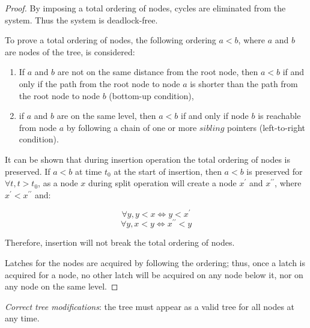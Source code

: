 \begin{proof}
  By imposing a total ordering of nodes, cycles are eliminated from the system. Thus the system is deadlock-free.

  To prove a total ordering of nodes, the following ordering $a < b$, where $a$ and $b$ are nodes of the tree, is considered:

  \begin{enumerate}
    \item If $a$ and $b$ are not on the same distance from the root node, then $a < b$ if and only if the path from the root node to node $a$ is shorter than the path from the root node to node $b$ (bottom-up condition),
    \item if $a$ and $b$ are on the same level, then $a < b$ if and only if node $b$ is reachable from node $a$ by following a chain of one or more $sibling$ pointers (left-to-right condition).
  \end{enumerate}

  It can be shown that during insertion operation the total ordering of nodes is preserved. If $a < b$ at time $t_0$ at the start of insertion, then $a < b$ is preserved for $\forall t, t > t_0$, as a node $x$ during split operation will create a node $x^\prime$ and $x^{\prime\prime}$, where $x^\prime < x^{\prime\prime}$ and:

  $$\forall y, y < x \Leftrightarrow y < x^\prime$$
  $$\forall y, x < y \Leftrightarrow x^{\prime\prime} < y$$

  Therefore, insertion will not break the total ordering of nodes.

  Latches for the nodes are acquired by following the ordering; thus, once a latch is acquired for a node, no other latch will be acquired on any node below it, nor on any node on the same level.
\end{proof}

\begin{theorem}\label{theorem:b-link-tree:modifications}
  \textit{Correct tree modifications}: the tree must appear as a valid tree for all nodes at any time.
\end{theorem}

